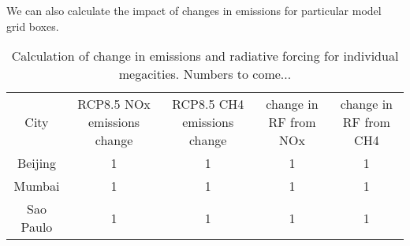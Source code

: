 We can also calculate the impact of changes in emissions for particular model grid boxes.

\begin{table} 
  \label{tab:megacity}
  \begin{tabular}{ c c c c c }
        City & RCP8.5 NOx emissions change & RCP8.5 CH4 emissions change & change in RF from NOx & change in RF from CH4 \\ 
        Beijing & 1 & 1 & 1 & 1 \\ 
        Mumbai & 1 & 1 & 1 & 1 \\ 
        Sao Paulo & 1 & 1 & 1 & 1 \\ 
    \end{tabular} 
    \caption{Calculation of change in emissions and radiative forcing for individual megacities. Numbers to come...} 
\end{table}

